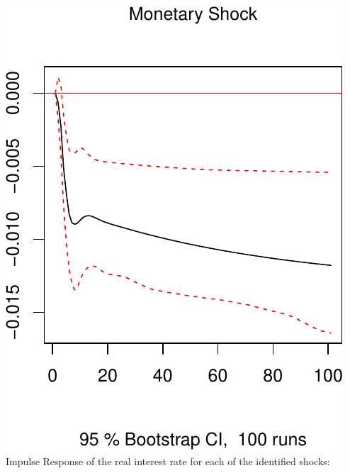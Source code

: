 \documentclass[11pt,preprint, authoryear]{elsarticle}
\numberwithin{equation}{section}
\numberwithin{figure}{section}
\numberwithin{table}{section}
\begin{document}
\includegraphics{TS_proj_files/figure-latex/unnamed-chunk-36-3.pdf}
\newpage Impulse Response of the real interest rate for each of the
identified shocks:
\end{document}
